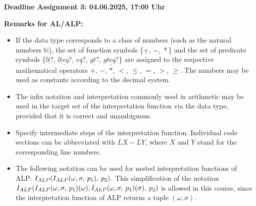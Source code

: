 \documentclass[10pt, a4paper]{article}
\begin{document}
\textbf{Deadline Assignment 3: 04.06.2025, 17:00 Uhr}

\textbf{Remarks for AL/ALP:}
\begin{itemize}
    \item If the data type corresponds to a class of numbers (such as the natural numbers $\mathbb{N}$), the set of function symbols \{$\underline{+}$, $\underline{-}$, $\underline{*}$\} and the set of predicate symbols \{$\underline{lt? }$, $\underline{lteq?}$, $\underline{eq?}$, $\underline{gt?}$, $\underline{gteq?}$\} are assigned to the respective mathematical operators $+$, $-$, $*$, $<$, $\leq$, $=$, $>$, $\geq$. The numbers may be used as constants according to the decimal system.

    \item The infix notation and interpretation commonly used in arithmetic may be used in the target set of the interpretation function via the data type, provided that it is correct and unambiguous.

    \item Specify intermediate steps of the interpretation function. Individual code sections can be abbreviated with $LX - LY$, where $X$ and $Y$ stand for the corresponding line numbers. 

    \item The following notation can be used for nested interpretation functions of ALP: $I_{ALP}(I_{ALP}(\omega, \sigma, \: p_1), \: p_2)$. This simplification of the notation $I_{ALP}(I_{ALP}(\omega, \sigma, \: p_1)(\omega),I_{ALP}(\omega, \sigma, \: p_1)(\sigma), \: p_2)$ is allowed in this course, since the interpretation function of ALP returns a tuple $(\omega,\sigma)$.

\end{itemize}
\end{document}
